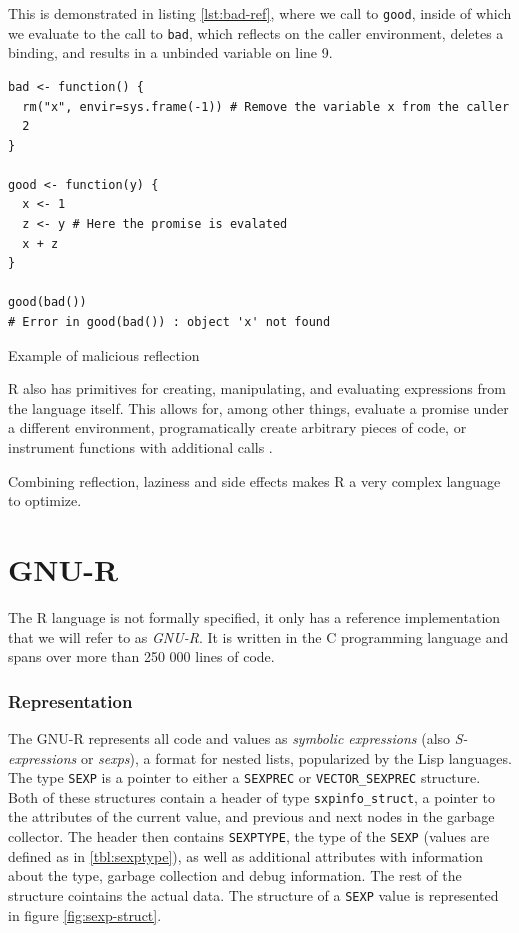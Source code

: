 This is demonstrated in listing \ref{lst:bad-ref}, where we call to \texttt{good}, inside of which we evaluate to the call to \texttt{bad}, which reflects on the caller environment, deletes a binding, and results in a unbinded variable on line 9.

\begin{listing}
	\centering
	\begin{verbatim}
bad <- function() {
  rm("x", envir=sys.frame(-1)) # Remove the variable x from the caller
  2
}

good <- function(y) {
  x <- 1
  z <- y # Here the promise is evalated
  x + z
}

good(bad())
# Error in good(bad()) : object 'x' not found
  \end{verbatim}
	\caption{Example of malicious reflection\todocite}\label{lst:bad-ref}
\end{listing}

R also has primitives for creating, manipulating, and evaluating expressions from the language itself. This allows for, among other things, evaluate a promise under a different environment, programatically create arbitrary pieces of code, or instrument functions with additional calls .

Combining reflection, laziness and side effects makes R a very complex language to optimize.

\newpage
\section{GNU-R}

The R language is not formally specified, it only has a reference implementation that we will refer to as \textit{GNU-R}. It is written in the C programming language and spans over more than {250 000} lines of code.

\subsubsection*{Representation}

The GNU-R represents all code and values as \textit{symbolic expressions} (also \textit{S-expressions} or \textit{sexps}), a format for nested lists, popularized by the Lisp languages. The type \texttt{SEXP} is a pointer to either a \texttt{SEXPREC} or \texttt{VECTOR\_SEXPREC} structure. Both of these structures contain a header of type \texttt{sxpinfo\_struct}, a pointer to the attributes of the current value, and previous and next nodes in the garbage collector. The header then contains \texttt{SEXPTYPE}, the type of the \texttt{SEXP} (values are defined as in \ref{tbl:sexptype}), as well as additional attributes with information about the type, garbage collection and debug information. The rest of the structure cointains the actual data. The structure of a \texttt{SEXP} value is represented in figure \ref{fig:sexp-struct}.

